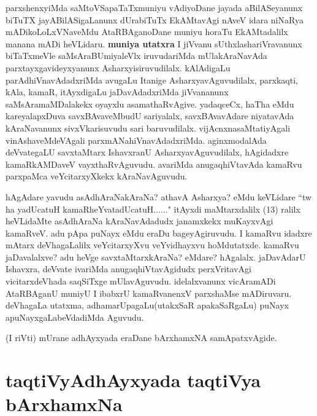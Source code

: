 \begin{artha}
parxshenxyiMda saMtoVSapaTaTxmuniyu vAdiyoDane jayada aBilASeyanunx biTuTX jayABilASigaLanunx dUrabiTuTx EkAMtavAgi nAveV idara niNaRya mADikoLoLxVNaveMdu AtaRBAganoDane muniyu horaTu EkAMtadalilx manana mADi heVLidaru.
\textbf{muniya utatxra} I jiVvanu sUthxlashariVravanunx biTaTxmeVle saMsAraBUmiyaleVlx iruvudariMda mUlakAraNavAda parxtayxgavideyxyanunx Asharxyisiruvudilalx. kAlAdigaLu parAdhiVnavAdadxriMda avugaLu Itanige AsharxyavAguvudilalx, parxkaqti, kAla, kamaR, itAyxdigaLu jaDavAdadxriMda jiVvananunx saMsAramaMDalakekx oyayxlu asamathaRvAgive. yadaqceCx, haTha eMdu kareyalapxDuva savxBAvaveMbudU sariyalalx, savxBAvavAdare niyatavAda kAraNavanunx sivxVkarisuvudu sari baruvudilalx. vijAcnxnasaMtatiyAgali vinAshaveMdeVAgali parxmANahiVnavAdadxriMda. aginxmodalAda deVvategaLU savxtaMtarx IshavxranU AsharxyavAguvudilalx, hAgidadxre kamaRkAMDaveV vayxthaRvAguvudu. avariMda anugaqhiVtavAda kamaRvu parxpaMca veYcitarxyXkekx kAraNavAguvudu.

hAgAdare yavudu asAdhAraNakAraNa? athavA Asharxya? eMdu keVLidare ``tw ha yadUcatuH kamaRheYvatadUcatuH......" itAyxdi maMtarxdalilx (13) ralilx heVLidaMte asAdhAraNa kAraNavAdadudx janamxkekx muKayxvAgi kamaRveV. adu pApa puNayx eMdu eraDu bageyAgiruvudu. I kamaRvu idadxre mAtarx deVhagaLalilx veYcitarxyXvu veYvidhayxvu hoMdutatxde. kamaRvu jaDavalalxve? adu heVge savxtaMtarxkAraNa? eMdare? hAgalalx. jaDavAdarU Ishavxra, deVvate ivariMda anugaqhiVtavAgidudx  perxVritavAgi vicitarxdeVhada saqSiTxge mUlavAguvudu. idelalxvanunx  vicAramADi AtaRBAganU muniyU I ibabxrU kamaRvanenxV parxshaMse mADiruvaru. deVhagaLa utatxma, adhamarUpagaLu(utakxSaR \ndash apakaSaRgaLu) puNayx apuNayxgaLabeVdadiMda Aguvudu.
\end{artha}


(I riVti) mUrane adhAyxyada eraDane bArxhamxNA samApatxvAgide.


\section*{taqtiVyAdhAyxyada taqtiVya bArxhamxNa}


